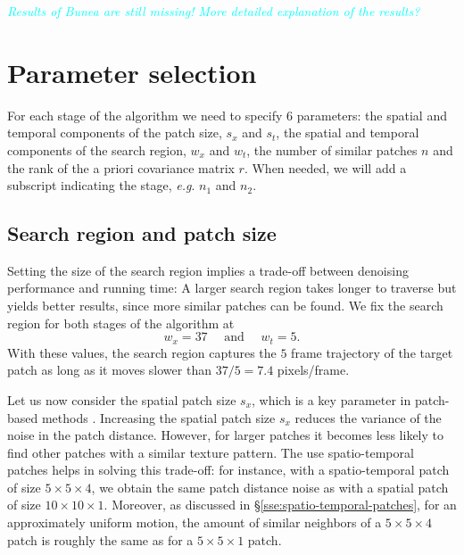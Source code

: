 \documentclass[10pt, journal, twocolumn, final, a4paper]{IEEEtran}
\newcommand{\pa}[1]{\textcolor{cyan}{#1}}
\newcommand{\pcomment}[1]{\textit{\pa{#1}}}
\newcommand{\ma}[1]{\boldsymbol{#1}}
\newcommand{\eg}{\emph{e.g}. } \newcommand{\Eg}{\emph{E.g}. }
\begin{document}
\pcomment{Results of Bunea are still missing!}
\pcomment{More detailed explanation of the results?}

\section{Parameter selection}
\label{sec:parameters}

For each stage of the algorithm we need to specify 6 parameters: the spatial
and temporal components of the patch size, $s_x$ and $s_t$, the spatial and
temporal components of the search region, $w_x$ and $w_t$, the number of similar
patches $n$ and the rank of the a priori covariance matrix $r$.
When needed, we will add a subscript indicating the stage, \eg
$n_{1}$ and $n_{2}$.

\subsection{Search region and patch size}

Setting the size of the search region implies a
trade-off between denoising performance and running time: A larger search
region takes longer to traverse but yields better results, since more
similar patches can be found. We fix the search
region for both stages of the algorithm at 
\begin{equation}
w_x = 37 \quad \text{ and } \quad w_t = 5.
\label{eq:search_region_parameters}
\end{equation}
With these values, the search region captures the $5$ frame trajectory of the
target patch as long as it moves slower than $37/5 = 7.4$
pixels/frame.


Let us now consider the spatial patch
size $s_x$, which is a key parameter in patch-based methods \cite{Buades2006,Kervrann2006,Boulanger2007}.
Increasing the spatial patch size $s_x$ reduces the variance of the noise in the patch
distance. 
However, for larger
patches it becomes less likely to find other patches with a similar texture
pattern. The use spatio-temporal patches helps in solving this trade-off: for
instance, with a spatio-temporal patch of size $5\times 5\times 4$, we obtain
the same patch distance noise as with a spatial patch of size $10\times 10
\times 1$. Moreover, as discussed in \S \ref{sse:spatio-temporal-patches}, for
an approximately uniform motion, the 
amount of similar neighbors of a $5\times 5\times 4$ patch is roughly the same
as for a $5\times 5\times 1$ patch.
\end{document}
